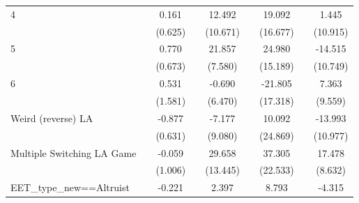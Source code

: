 \begin{table}[htbp]
\begin{tabular}{l*{8}{c}}
4                   &                     &       0.161         &                     &      12.492         &                     &      19.092         &                     &       1.445         \\
                    &                     &     (0.625)         &                     &    (10.671)         &                     &    (16.677)         &                     &    (10.915)         \\
5                   &                     &       0.770         &                     &      21.857\sym{**} &                     &      24.980         &                     &     -14.515         \\
                    &                     &     (0.673)         &                     &     (7.580)         &                     &    (15.189)         &                     &    (10.749)         \\
6                   &                     &       0.531         &                     &      -0.690         &                     &     -21.805         &                     &       7.363         \\
                    &                     &     (1.581)         &                     &     (6.470)         &                     &    (17.318)         &                     &     (9.559)         \\
Weird (reverse) LA  &                     &      -0.877         &                     &      -7.177         &                     &      10.092         &                     &     -13.993         \\
                    &                     &     (0.631)         &                     &     (9.080)         &                     &    (24.869)         &                     &    (10.977)         \\
Multiple Switching LA Game&                     &      -0.059         &                     &      29.658\sym{*}  &                     &      37.305         &                     &      17.478\sym{*}  \\
                    &                     &     (1.006)         &                     &    (13.445)         &                     &    (22.533)         &                     &     (8.632)         \\
EET\_type\_new==Altruist&                     &      -0.221         &                     &       2.397         &                     &       8.793         &                     &      -4.315         \\

\end{tabular}
\end{table}
